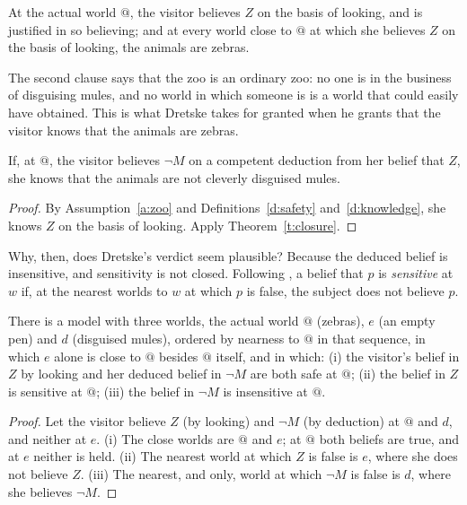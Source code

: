 \documentclass{situationist-preprint}
\begin{document}
\begin{assumption}\label{a:zoo}
At the actual world $@$, the visitor believes $Z$ on the basis of looking, and is justified in so believing; and at every world close to $@$ at which she believes $Z$ on the basis of looking, the animals are zebras.
\end{assumption}

The second clause says that the zoo is an ordinary zoo: no one is in the business of disguising mules, and no world in which someone is is a world that could easily have obtained. This is what Dretske takes for granted when he grants that the visitor knows that the animals are zebras.

\begin{corollary}\label{c:zebra}
If, at $@$, the visitor believes $\neg M$ on a competent deduction from her belief that $Z$, she knows that the animals are not cleverly disguised mules.
\end{corollary}

\begin{proof}
By Assumption~\ref{a:zoo} and Definitions~\ref{d:safety} and~\ref{d:knowledge}, she knows $Z$ on the basis of looking. Apply Theorem~\ref{t:closure}.
\end{proof}

Why, then, does Dretske's verdict seem plausible? Because the deduced belief is insensitive, and sensitivity is not closed. Following \citet{Nozick1981}, a belief that $p$ is \emph{sensitive} at $w$ if, at the nearest worlds to $w$ at which $p$ is false, the subject does not believe $p$.

\begin{proposition}\label{p:model}
There is a model with three worlds, the actual world $@$ (zebras), $e$ (an empty pen) and $d$ (disguised mules), ordered by nearness to $@$ in that sequence, in which $e$ alone is close to $@$ besides $@$ itself, and in which: (i) the visitor's belief in $Z$ by looking and her deduced belief in $\neg M$ are both safe at $@$; (ii) the belief in $Z$ is sensitive at $@$; (iii) the belief in $\neg M$ is insensitive at $@$.
\end{proposition}

\begin{proof}
Let the visitor believe $Z$ (by looking) and $\neg M$ (by deduction) at $@$ and $d$, and neither at $e$. (i) The close worlds are $@$ and $e$; at $@$ both beliefs are true, and at $e$ neither is held. (ii) The nearest world at which $Z$ is false is $e$, where she does not believe $Z$. (iii) The nearest, and only, world at which $\neg M$ is false is $d$, where she believes $\neg M$.
\end{proof}
\end{document}
